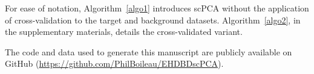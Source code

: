 For ease of notation, Algorithm~\ref{algo1} introduces scPCA without the application of cross-validation to the target and background datasets. Algorithm~\ref{algo2},
in the supplementary materials, details the cross-validated variant.

The code and data used to generate this manuscript are publicly available on
GitHub (\url{https://github.com/PhilBoileau/EHDBDscPCA}).